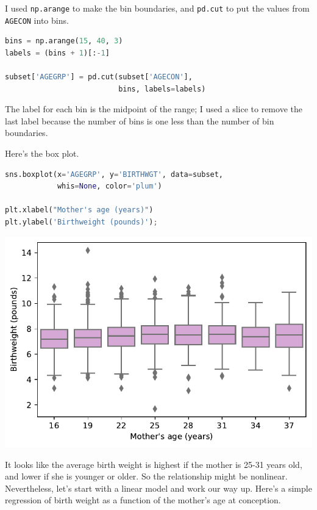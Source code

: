 I used \passthrough{\lstinline!np.arange!} to make the bin boundaries,
and \passthrough{\lstinline!pd.cut!} to put the values from
\passthrough{\lstinline!AGECON!} into bins.

\begin{lstlisting}[language=Python,style=source]
bins = np.arange(15, 40, 3)
labels = (bins + 1)[:-1]

subset['AGEGRP'] = pd.cut(subset['AGECON'], 
                          bins, labels=labels)
\end{lstlisting}

The label for each bin is the midpoint of the range; I used a slice to
remove the last label because the number of bins is one less than the
number of bin boundaries.

Here's the box plot.

\begin{lstlisting}[language=Python,style=source]
sns.boxplot(x='AGEGRP', y='BIRTHWGT', data=subset, 
            whis=None, color='plum')

plt.xlabel("Mother's age (years)")
plt.ylabel('Birthweight (pounds)');
\end{lstlisting}

\begin{center}
\includegraphics[scale=0.75]{13_hypothesis_files/13_hypothesis_118_0.pdf}
\end{center}

It looks like the average birth weight is highest if the mother is 25-31
years old, and lower if she is younger or older. So the relationship
might be nonlinear. Nevertheless, let's start with a linear model and
work our way up. Here's a simple regression of birth weight as a
function of the mother's age at conception.

